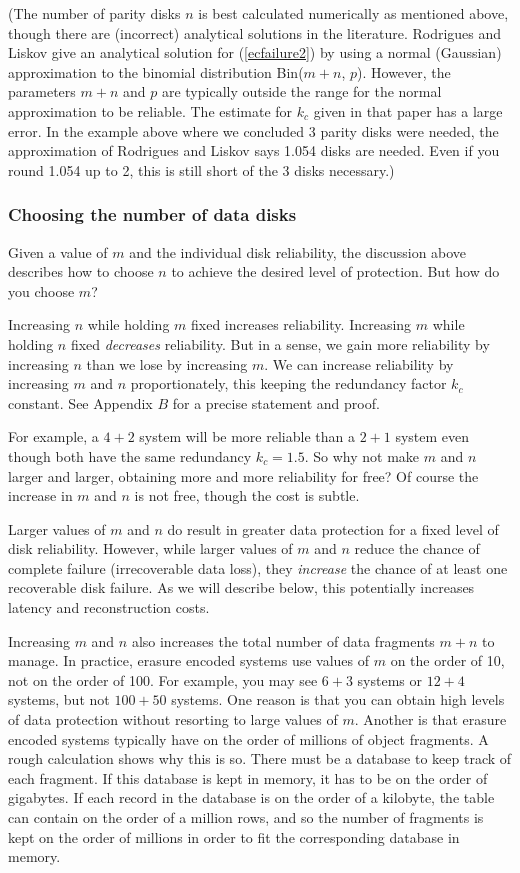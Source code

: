 (The number of parity disks $n$ is best calculated numerically as mentioned above, though there are (incorrect) analytical solutions in the literature. Rodrigues and Liskov \cite{rl} give an analytical solution for (\ref{ecfailure2}) by using a normal (Gaussian) approximation to the binomial distribution Bin($m+n$, $p$). However, the parameters $m+n$ and $p$ are typically outside the range for the normal approximation to be reliable. The estimate for $k_c$ given in that paper has a large error. In the example above where we concluded 3 parity disks were needed, the approximation of Rodrigues and Liskov says 1.054 disks are needed. Even if you round 1.054 up to 2, this is still short of the 3 disks necessary.)

\subsubsection{Choosing the number of data disks}

Given a value of $m$ and the individual disk reliability, the discussion above describes how to choose $n$ to achieve the desired level of protection. But how do you choose $m$?

Increasing $n$ while holding $m$ fixed increases reliability. Increasing $m$ while holding $n$ fixed \emph{decreases} reliability. But in a sense, we gain more reliability by increasing $n$ than we lose by increasing $m$. We can increase reliability by increasing $m$ and $n$ proportionately, this keeping the redundancy factor $k_c$ constant. See Appendix $B$ for a precise statement and proof.

For example, a $4+2$ system will be more reliable than a $2+1$ system even though both have the same redundancy $k_c = 1.5$. So why not make $m$ and $n$ larger and larger, obtaining more and more reliability for free? Of course the increase in $m$ and $n$ is not free, though the cost is subtle.

Larger values of $m$ and $n$ do result in greater data protection for a fixed level of disk reliability. However, while larger values of $m$ and $n$ reduce the chance of complete failure (irrecoverable data loss), they \emph{increase} the chance of at least one recoverable disk failure. As we will describe below, this potentially increases latency and reconstruction costs.

Increasing $m$ and $n$ also increases the total number of data fragments $m+n$ to manage. In practice, erasure encoded systems use values of $m$ on the order of 10, not on the order of 100.  For example, you may see $6+3$ systems or $12+4$ systems, but not $100+50$ systems. One reason is that you can obtain high levels of data protection without resorting to large values of $m$. Another is that erasure encoded systems typically have on the order of millions of object fragments. A rough calculation shows why this is so. There must be a database to keep track of each fragment. If this database is kept in memory, it has to be on the order of gigabytes. If each record in the database is on the order of a kilobyte, the table can contain on the order of a million rows, and so the number of fragments is kept on the order of millions in order to fit the corresponding database in memory.


